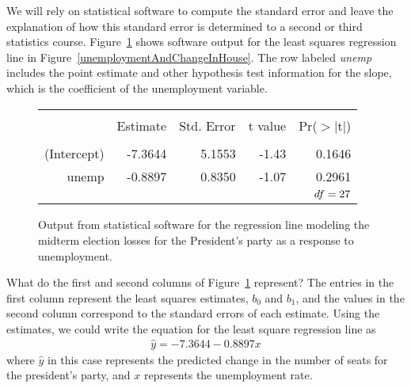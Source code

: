 We will rely on statistical software to compute the standard
error and leave the explanation of how this standard error
is determined to a second or third statistics course.
Figure~\ref{midtermUnempRegTable} shows software output for
the least squares regression line in
Figure~\ref{unemploymentAndChangeInHouse}.
The row labeled \emph{unemp} includes the point estimate
and other hypothesis test information for the slope,
which is the coefficient of the unemployment variable.

\begin{figure}[ht]
\centering
\begin{tabular}{rrrrr}
  \hline
  \vspace{-3.7mm} & & & & \\
  & Estimate & Std. Error & t value & Pr($>$$|$t$|$) \\ 
  \hline
  \vspace{-3.6mm} & & & & \\
  (Intercept) & -7.3644 & 5.1553 & -1.43 & 0.1646 \\ 
  unemp & -0.8897 & 0.8350 & -1.07 & 0.2961 \\ 
  \hline
  \multicolumn{5}{r}{$df=27{}$} \\
\end{tabular}
\caption{Output from statistical software for the regression
    line modeling the midterm election losses for the
    President's party as a response to unemployment.}
\label{midtermUnempRegTable}
\end{figure}

\begin{examplewrap}
\begin{nexample}{What do the first and second columns
    of Figure~\ref{midtermUnempRegTable} represent?}
  The entries in the first column represent the least
  squares estimates, $b_0$ and $b_1$, and the values in
  the second column correspond to the standard errors
  of each estimate.
  Using the estimates, we could write the equation
  for the least square regression line as
  \begin{align*}
  \hat{y} = -7.3644 - 0.8897 x
  \end{align*}
  where $\hat{y}$ in this case represents the predicted
  change in the number of seats for the president's party,
  and $x$ represents the unemployment rate.
\end{nexample}
\end{examplewrap}

\D{\newpage}

